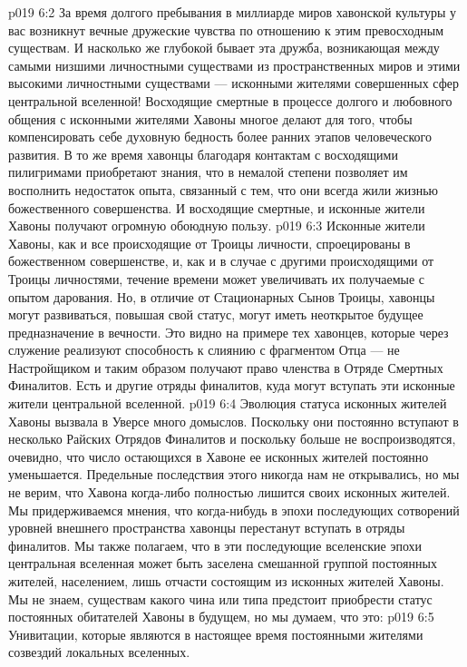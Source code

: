 \vs p019 6:2 За время долгого пребывания в миллиарде миров хавонской культуры у вас возникнут вечные дружеские чувства по отношению к этим превосходным существам. И насколько же глубокой бывает эта дружба, возникающая между самыми низшими личностными существами из пространственных миров и этими высокими личностными существами --- исконными жителями совершенных сфер центральной вселенной! Восходящие смертные в процессе долгого и любовного общения с исконными жителями Хавоны многое делают для того, чтобы компенсировать себе духовную бедность более ранних этапов человеческого развития. В то же время хавонцы благодаря контактам с восходящими пилигримами приобретают знания, что в немалой степени позволяет им восполнить недостаток опыта, связанный с тем, что они всегда жили жизнью божественного совершенства. И восходящие смертные, и исконные жители Хавоны получают огромную обоюдную пользу.
\vs p019 6:3 \pc Исконные жители Хавоны, как и все происходящие от Троицы личности, спроецированы в божественном совершенстве, и, как и в случае с другими происходящими от Троицы личностями, течение времени может увеличивать их получаемые с опытом дарования. Но, в отличие от Стационарных Сынов Троицы, хавонцы могут развиваться, повышая свой статус, могут иметь неоткрытое будущее предназначение в вечности. Это видно на примере тех хавонцев, которые через служение реализуют способность к слиянию с фрагментом Отца --- не Настройщиком и таким образом получают право членства в Отряде Смертных Финалитов. Есть и другие отряды финалитов, куда могут вступать эти исконные жители центральной вселенной.
\vs p019 6:4 \pc Эволюция статуса исконных жителей Хавоны вызвала в Уверсе много домыслов. Поскольку они постоянно вступают в несколько Райских Отрядов Финалитов и поскольку больше не воспроизводятся, очевидно, что число остающихся в Хавоне ее исконных жителей постоянно уменьшается. Предельные последствия этого никогда нам не открывались, но мы не верим, что Хавона когда\hyp{}либо полностью лишится своих исконных жителей. Мы придерживаемся мнения, что когда\hyp{}нибудь в эпохи последующих сотворений уровней внешнего пространства хавонцы перестанут вступать в отряды финалитов. Мы также полагаем, что в эти последующие вселенские эпохи центральная вселенная может быть заселена смешанной группой постоянных жителей, населением, лишь отчасти состоящим из исконных жителей Хавоны. Мы не знаем, существам какого чина или типа предстоит приобрести статус постоянных обитателей Хавоны в будущем, но мы думаем, что это:
\vs p019 6:5 \bibnobreakspace Унивитации, которые являются в настоящее время постоянными жителями созвездий локальных вселенных.

